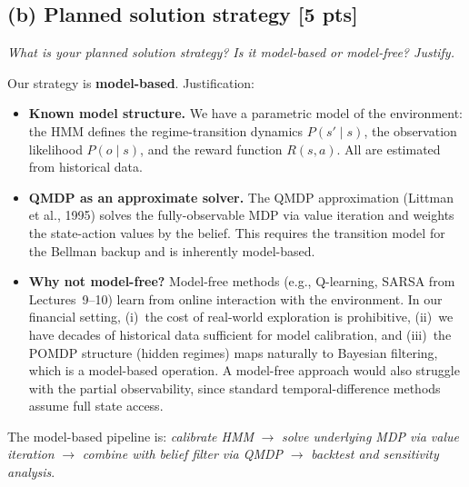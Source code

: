 \documentclass[12pt]{article}
\begin{document}
\subsection*{(b) Planned solution strategy \hfill [5 pts]}

\textit{What is your planned solution strategy? Is it model-based or model-free? Justify.}

Our strategy is \textbf{model-based}. Justification:

\begin{itemize}[nosep]
  \item \textbf{Known model structure.} We have a parametric model of the environment: the HMM defines the regime-transition dynamics $P(s'\!\mid\! s)$, the observation likelihood $P(o\!\mid\! s)$, and the reward function $R(s, a)$. All are estimated from historical data.

  \item \textbf{QMDP as an approximate solver.} The QMDP approximation (Littman et al., 1995) solves the fully-observable MDP via value iteration and weights the state-action values by the belief. This requires the transition model for the Bellman backup and is inherently model-based.

  \item \textbf{Why not model-free?} Model-free methods (e.g., Q-learning, SARSA from Lectures~9--10) learn from online interaction with the environment. In our financial setting, (i)~the cost of real-world exploration is prohibitive, (ii)~we have decades of historical data sufficient for model calibration, and (iii)~the POMDP structure (hidden regimes) maps naturally to Bayesian filtering, which is a model-based operation. A model-free approach would also struggle with the partial observability, since standard temporal-difference methods assume full state access.
\end{itemize}

The model-based pipeline is: \emph{calibrate HMM} $\to$ \emph{solve underlying MDP via value iteration} $\to$ \emph{combine with belief filter via QMDP} $\to$ \emph{backtest and sensitivity analysis}.
\end{document}
